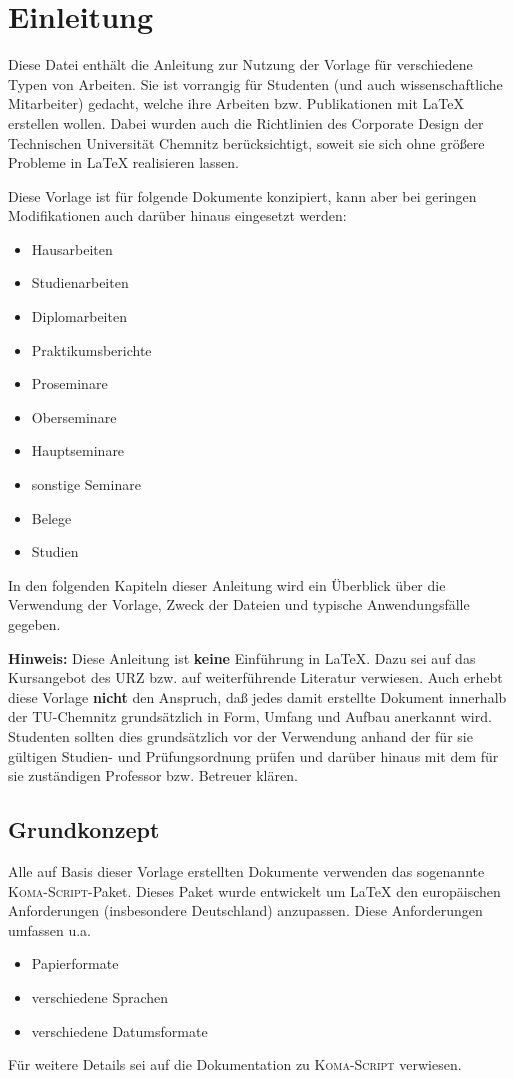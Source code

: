 \chapter{Einleitung}
Diese Datei enthält die Anleitung zur Nutzung der Vorlage für verschiedene
Typen von Arbeiten. Sie ist vorrangig für Studenten (und auch wissenschaftliche
Mitarbeiter) gedacht, welche ihre Arbeiten bzw. Publikationen mit \LaTeX{}
erstellen wollen. Dabei wurden auch die Richtlinien des Corporate Design
der Technischen Universität Chemnitz berücksichtigt, soweit sie sich
ohne größere Probleme in \LaTeX{} realisieren lassen.

Diese Vorlage ist für folgende Dokumente konzipiert, kann aber bei geringen
Modifikationen auch darüber hinaus eingesetzt werden:
\begin{itemize}
\item Hausarbeiten
\item Studienarbeiten
\item Diplomarbeiten
\item Praktikumsberichte
\item Proseminare
\item Oberseminare
\item Hauptseminare
\item sonstige Seminare
\item Belege
\item Studien
\end{itemize}

In den folgenden Kapiteln dieser Anleitung wird ein Überblick über die
Verwendung der Vorlage, Zweck der Dateien und typische Anwendungsfälle
gegeben. 

\textbf{Hinweis:} Diese Anleitung ist \textbf{keine} Einführung
in \LaTeX. Dazu sei auf das Kursangebot des URZ bzw. auf weiterführende
Literatur verwiesen. Auch erhebt diese Vorlage \textbf{nicht} den Anspruch,
daß jedes damit erstellte Dokument innerhalb der TU-Chemnitz grundsätzlich
in Form, Umfang und Aufbau anerkannt wird. Studenten sollten dies 
grundsätzlich vor der Verwendung anhand der für sie gültigen Studien- 
und Prüfungsordnung prüfen und darüber hinaus mit dem für sie 
zuständigen Professor bzw. Betreuer klären.

\section{Grundkonzept}
Alle auf Basis dieser Vorlage erstellten Dokumente verwenden das sogenannte
{\scshape Koma-Script}-Paket. Dieses Paket wurde entwickelt um \LaTeX{} den
europäischen Anforderungen (insbesondere Deutschland) anzupassen.
Diese Anforderungen umfassen u.a.
\begin{itemize}
\item Papierformate
\item verschiedene Sprachen
\item verschiedene Datumsformate
\end{itemize}
Für weitere Details sei auf die Dokumentation zu {\scshape Koma-Script} 
verwiesen.


